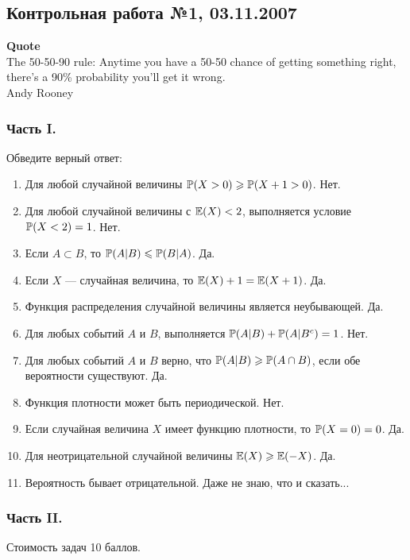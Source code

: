 \subsection{Контрольная работа №1, 03.11.2007}

\textbf{Quote}\\
The 50-50-90 rule: Anytime you have a 50-50 chance of getting something right, there's a 90\% probability you'll get it wrong. \\
Andy Rooney\\

\subsubsection*{Часть I.}

Обведите верный ответ:

\begin{enumerate}
\item Для любой случайной величины $\P(X>0)\ge \P(X+1>0)$. Нет.
\item Для любой случайной величины с $\E(X)<2$, выполняется условие $\P(X<2)=1$. Нет.
\item Если $A\subset B$, то $\P(A|B)\le \P(B|A)$. Да.
\item Если  $X$  — случайная величина, то $\E(X)+1=\E(X+1)$. Да.
\item Функция распределения случайной величины является неубывающей. Да.
\item Для любых событий $A$ и $B$, выполняется $\P(A|B)+\P(A|B^{c})=1$. Нет.
\item Для любых событий  $A$  и  $B$  верно, что $\P(A|B)\ge \P(A\cap
B)$, если обе вероятности существуют. Да.
\item Функция плотности может быть периодической. Нет.
\item Если случайная величина $X$ имеет функцию плотности, то $\P(X=0)=0$. Да.
\item Для неотрицательной случайной величины $\E(X)\ge \E(-X)$. Да.
\item Вероятность бывает отрицательной. Даже не знаю, что и сказать...
\end{enumerate}

\subsubsection*{Часть II.}

Стоимость задач 10 баллов.

